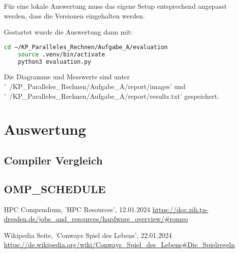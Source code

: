 \documentclass[plainarticle,zihtitle,german,final,hyperref,utf8]{zihpub}
\begin{document}
Für eine lokale Auswertung muss das eigene Setup entsprechend angepasst werden, dass die Versionen eingehalten werden.

Gestartet wurde die Auswertung dann mit:

\begin{lstlisting}[language=bash]
	cd ~/KP_Paralleles_Rechnen/Aufgabe_A/evaluation
	source .venv/bin/activate
	python3 evaluation.py
\end{lstlisting}

Die Diagramme und Messwerte sind unter '~/KP\_Paralleles\_Rechnen/Aufgabe\_A/report/images' und '~/KP\_Paralleles\_Rechnen/Aufgabe\_A/report/results.txt' gespeichert.

\section{Auswertung}
\subsection{Compiler Vergleich}
\subsection{OMP\_SCHEDULE}

\newpage
\begin{thebibliography}{9}
	HPC Compendium, 'HPC Resources', 12.01.2024\newline
	\url{https://doc.zih.tu-dresden.de/jobs_and_resources/hardware_overview/#romeo}
	
	Wikipedia Seite, 'Conways Spiel des Lebens', 22.01.2024\newline
	\url{https://de.wikipedia.org/wiki/Conways_Spiel_des_Lebens#Die_Spielregeln}
\end{thebibliography}
\end{document}
